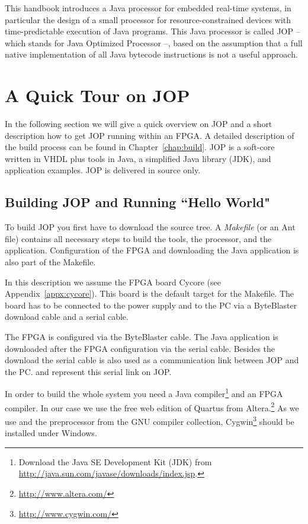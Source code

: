 

This handbook introduces a Java processor for embedded real-time
systems, in particular the design of a small processor for
resource-constrained devices with time-predictable execution of Java
programs. This Java processor is called JOP -- which stands for Java
Optimized Processor --, based on the assumption that a full native
implementation of all Java bytecode instructions is not a useful
approach.

\section{A Quick Tour on JOP}

In the following section we will give a quick overview on JOP and a
short description how to get JOP running within an FPGA. A detailed
description of the build process can be found in
Chapter~\ref{chap:build}. JOP is a soft-core written in VHDL plus
tools in Java, a simplified Java library (JDK), and application
examples. JOP is delivered in source only.

\subsection{Building JOP and Running ``Hello World"}

To build JOP you first have to download the source tree. A
\emph{Makefile} (or an Ant file) contains all necessary steps to
build the tools, the processor, and the application. Configuration of
the FPGA and downloading the Java application is also part of the
Makefile.

In this description we assume the FPGA board Cycore (see
Appendix~\ref{appx:cycore}). This board is the default target for
the Makefile. The board has to be connected to the power supply and
to the PC via a ByteBlaster download cable and a serial cable.

The FPGA is configured via the ByteBlaster cable. The Java
application is downloaded after the FPGA configuration via the serial
cable. Besides the download the serial cable is also used as a
communication link between JOP and the PC.  and
 represent this serial link on JOP.

In order to build the whole system you need a Java
compiler\footnote{Download the Java SE Development Kit (JDK) from
\url{http://java.sun.com/javase/downloads/index.jsp}.} and an FPGA
compiler. In our case we use the free web edition of Quartus from
Altera.\footnote{\url{http://www.altera.com/}} As we use 
and the preprocessor from the GNU compiler collection,
Cygwin\footnote{\url{http://www.cygwin.com/}} should be installed
under Windows.

